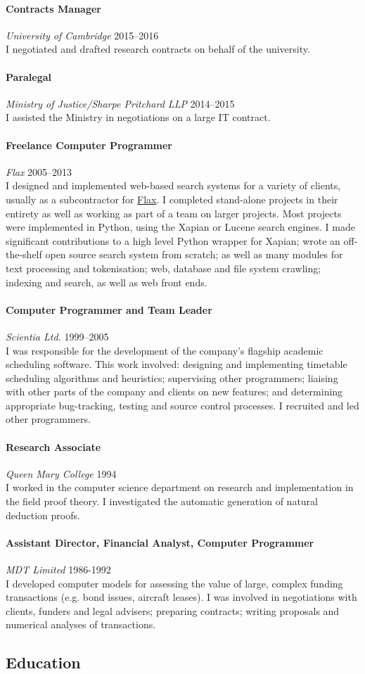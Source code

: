 \documentclass[11pt,a4paper]{article}
\newcommand{\centry}[3]{\paragraph{#1} \textit{#2}%
\hfill#3\\[2pt]}
\begin{document}
\centry{Contracts Manager}{University of Cambridge}{2015--2016}
I negotiated and drafted research contracts on behalf of the university.

\centry{Paralegal}{Ministry of Justice/Sharpe Pritchard LLP}{2014--2015} I
assisted the Ministry in negotiations on a large IT contract.

\centry{Freelance Computer Programmer}{Flax}{2005--2013} I designed and
implemented web-based search systems for a variety of clients, usually as a
subcontractor for \href{http://www.flax.co.uk}{Flax}. I completed stand-alone
projects in their entirety as well as working as part of a team on larger
projects.  Most projects were implemented in Python, using the Xapian or Lucene
search engines. I made significant contributions to a high level Python wrapper
for Xapian; wrote an off-the-shelf open source search system from scratch; as
well as many modules for text processing and tokenisation; web, database and
file system crawling; indexing and search, as well as web front ends.

\centry{Computer Programmer and Team Leader}{Scientia Ltd.}{1999--2005} I was
responsible for the development of the company's flagship academic scheduling
software. This work involved: designing and implementing timetable scheduling
algorithms and heuristics; supervising other programmers; liaising with other
parts of the company and clients on new features; and determining appropriate
bug-tracking, testing and source control processes. I recruited and led other
programmers.


\centry{Research Associate}{Queen Mary College}{1994}
I worked in the computer science department on research and implementation in
the field proof theory. I investigated the automatic generation of natural
deduction proofs.

\centry{Assistant Director, Financial Analyst, Computer Programmer}{MDT
  Limited}{1986-1992}
I developed computer models for assessing the value of large, complex
funding transactions (e.g. bond issues, aircraft leases). I was involved in
negotiations with clients, funders and legal advisers; preparing contracts;
writing proposals and numerical analyses of transactions.


\subsection*{Education}
\end{document}
